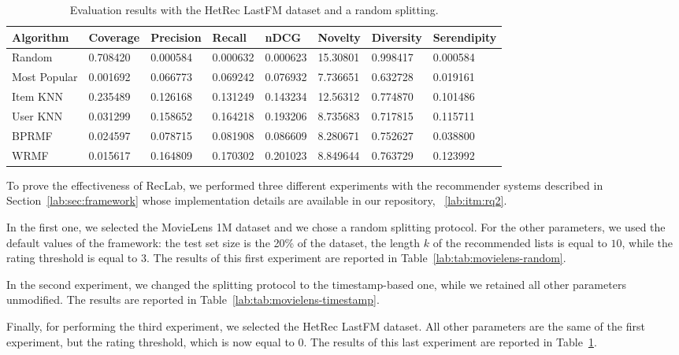 \begin{table}
\centering
\begin{tabular}{@{}llllllll@{}}
\toprule
Algorithm    & Coverage & Precision & Recall   & nDCG     & Novelty  & Diversity & Serendipity \\ \midrule
Random       & 0.708420 & 0.000584  & 0.000632 & 0.000623 & 15.30801 & 0.998417  & 0.000584    \\
Most Popular & 0.001692 & 0.066773  & 0.069242 & 0.076932 & 7.736651 & 0.632728  & 0.019161    \\
Item KNN     & 0.235489 & 0.126168  & 0.131249 & 0.143234 & 12.56312 & 0.774870  & 0.101486    \\
User KNN     & 0.031299 & 0.158652  & 0.164218 & 0.193206 & 8.735683 & 0.717815  & 0.115711    \\
BPRMF        & 0.024597 & 0.078715  & 0.081908 & 0.086609 & 8.280671 & 0.752627  & 0.038800    \\
WRMF         & 0.015617 & 0.164809  & 0.170302 & 0.201023 & 8.849644 & 0.763729  & 0.123992    \\ \bottomrule
\end{tabular}
\caption[Evaluation with LastFM and random splitting]{Evaluation results with the HetRec LastFM dataset and a random splitting.}
\label{lab:tab:lastfm}
\end{table}

To prove the effectiveness of RecLab, we performed three different experiments with the recommender systems described in Section~\ref{lab:sec:framework} whose implementation details are available in our repository, ~\ref{lab:itm:rq2}.

In the first one, we selected the MovieLens 1M dataset and we chose a random splitting protocol. For the other parameters, we used the default values of the framework: the test set size is the 20\% of the dataset, the length $k$ of the recommended lists is equal to $10$, while the rating threshold is equal to $3$. The results of this first experiment are reported in Table~\ref{lab:tab:movielens-random}.

In the second experiment, we changed the splitting protocol to the timestamp-based one, while we retained all other parameters unmodified. The results are reported in Table~\ref{lab:tab:movielens-timestamp}.

Finally, for performing the third experiment, we selected the HetRec LastFM dataset. All other parameters are the same of the first experiment, but the rating threshold, which is now equal to $0$. The results of this last experiment are reported in Table~\ref{lab:tab:lastfm}.

